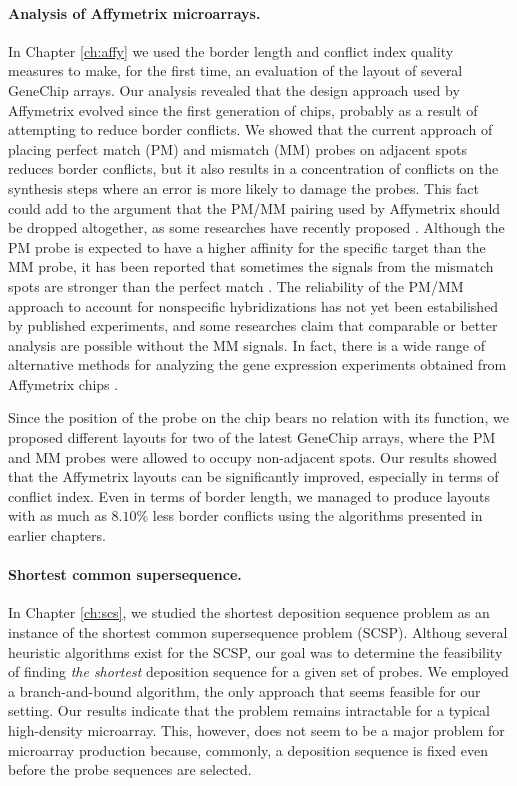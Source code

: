\paragraph{Analysis of Affymetrix microarrays.} In Chapter \ref{ch:affy} we used
the border length and conflict index quality measures to make, for the first time, an
evaluation of the layout of several GeneChip arrays. Our analysis
revealed that the design approach used by Affymetrix
evolved since the first generation of chips, probably as a result of attempting
to reduce border conflicts. We showed that the current approach of placing
perfect match (PM) and mismatch (MM) probes on adjacent spots reduces
border conflicts, but it also results in a concentration of
conflicts on the synthesis steps where an error is more likely to damage the
probes. This fact could add to the argument that the PM/MM pairing used by
Affymetrix should be dropped altogether, as some researches have recently
proposed \citep{Lauren2003}. Although the PM probe is expected to have a higher
affinity for the specific target than the MM probe, it has been reported that
sometimes the signals from the mismatch spots are stronger than the perfect
match \citep{Naef2003}. The reliability of the PM/MM approach to account for
nonspecific hybridizations has not yet been estabilished by published
experiments, and some researches claim that comparable or better analysis are
possible without the MM signals. In fact, there is a wide range of alternative
methods for analyzing the gene expression experiments obtained from Affymetrix
chips \citep{Irizarry2006,Millenaar2006}.

Since the position of the probe on the chip bears no relation with its function,
we proposed different layouts for two of the latest GeneChip arrays, where the
PM and MM probes were allowed to occupy non-adjacent spots. Our results showed
that the Affymetrix layouts can be significantly improved, especially in terms
of conflict index. Even in terms of border length, we managed to produce layouts
with as much as $8.10\%$ less border conflicts using the algorithms presented in
earlier chapters.

\paragraph{Shortest common supersequence.}
In Chapter \ref{ch:scs}, we studied the shortest deposition sequence problem as
an instance of the shortest common supersequence problem (SCSP). Althoug several
heuristic algorithms exist for the SCSP, our goal was to determine the
feasibility of finding \emph{the shortest} deposition sequence for a given set
of probes. We employed a branch-and-bound algorithm, the only approach that
seems feasible for our setting. Our results indicate that the problem remains
intractable for a typical high-density microarray. This, however, does not seem
to be a major problem for microarray production because, commonly, a deposition
sequence is fixed even before the probe sequences are selected.

